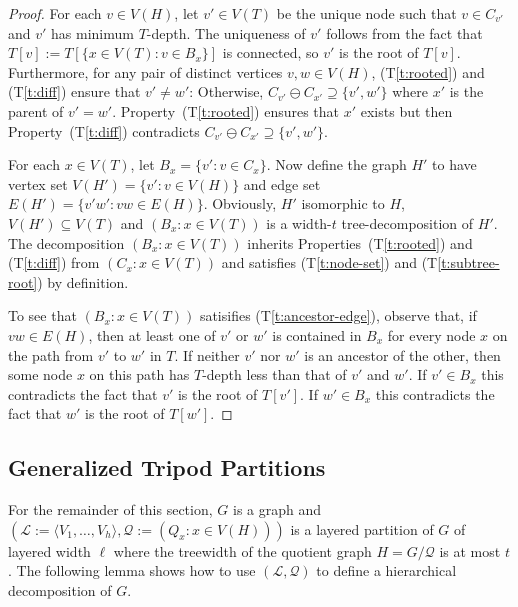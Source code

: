 \documentclass{patmorin}
\newcommand{\tref}[1]{(T\ref{t:#1})}
\begin{document}
\begin{proof}
  For each $v\in V(H)$, let $v'\in V(T)$ be the unique node such that $v\in C_{v'}$ and $v'$ has minimum $T$-depth.  The uniqueness of $v'$ follows from the fact that $T[v]:=T[\{x\in V(T):v\in B_x\}]$ is connected, so $v'$ is the root of $T[v]$.  Furthermore, for any pair of distinct vertices $v,w\in V(H)$, \tref{rooted} and \tref{diff} ensure that $v'\neq w'$: Otherwise, $C_{v'}\ominus C_{x'}\supseteq \{v',w'\}$ where $x'$ is the parent of $v'=w'$.  Property~\tref{rooted} ensures that $x'$ exists but then Property~\tref{diff} contradicts $C_{v'}\ominus C_{x'}\supseteq \{v',w'\}$.
  
  For each $x\in V(T)$, let $B_x=\{v' : v\in C_x\}$.  Now define the graph $H'$ to have vertex set $V(H')=\{v':v\in V(H)\}$ and edge set $E(H')=\{v'w': vw\in E(H)\}$.  Obviously, $H'$ isomorphic to $H$, $V(H')\subseteq V(T)$ and $(B_x: x\in V(T))$ is a width-$t$ tree-decomposition of $H'$.  The decomposition $(B_x: x\in V(T))$ inherits Properties~\tref{rooted} and \tref{diff} from $(C_x:x\in V(T))$ and satisfies \tref{node-set} and \tref{subtree-root} by definition.
  
  To see that $(B_x:x\in V(T))$ satisifies \tref{ancestor-edge}, observe that, if $vw\in E(H)$, then at least one of $v'$ or $w'$ is contained in $B_x$ for every node $x$ on the path from $v'$ to $w'$ in $T$.  If neither $v'$ nor $w'$ is an ancestor of the other, then some node $x$ on this path has $T$-depth less than that of $v'$ and $w'$.  If $v'\in B_x$ this contradicts the fact that $v'$ is the root of $T[v']$.  If $w'\in B_x$ this contradicts the fact that $w'$ is the root of $T[w']$.
\end{proof}

\subsection{Generalized Tripod Partitions}

For the remainder of this section, $G$ is a graph and $(\mathcal{L}:=\langle V_1,\ldots,V_h\rangle,\mathcal{Q}:=(Q_x: x\in V(H)))$ is a layered partition of $G$ of layered width $\ell$ where the treewidth of the quotient graph $H=G/\mathcal{Q}$ is at most $t$.  The following lemma shows how to use $(\mathcal{L},\mathcal{Q})$ to define a hierarchical decomposition of $G$.
\end{document}

